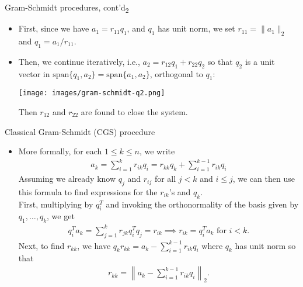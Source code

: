 \documentclass[t,usepdftitle=false]{beamer}
\begin{document}
\begin{frame}{Gram-Schmidt procedures, cont'd\textsubscript{2}}
\begin{itemize}
\item First, since we have $a_1=r_{11}q_1$, and $q_1$ has unit norm, we set $r_{11}=\|a_1\|_2$ and $q_1=a_1/r_{11}$.
\item Then, we continue iteratively, i.e., $a_2=r_{12}q_1+r_{22}q_2$ so that $q_2$ is a unit vector in $\mathrm{span}\{q_1,a_2\}=\mathrm{span}\{a_1,a_2\}$, orthogonal to $q_1$:\vspace{.2cm}
\begin{center}
\vspace{.2cm}
\texttt{[image: images/gram-schmidt-q2.png]}\vspace{.2cm}
\end{center}
Then $r_{12}$ and $r_{22}$ are found to close the system.
\end{itemize}
\end{frame}

\begin{frame}{Classical Gram-Schmidt (CGS) procedure}
\begin{itemize}
\item More formally, for each $1\leq k\leq n$, we write
\begin{align*}
a_k=\sum_{i=1}^kr_{ik}q_i=r_{kk}q_k+\sum_{i=1}^{k-1}r_{ik}q_i
\end{align*}
Assuming we already know $q_j$ and $r_{ij}$ for all $j<k$ and $i\leq j$, we can then use this formula to find expressions for the $r_{ik}$'s and $q_k$.\vspace{.1cm}\\
First, multiplying by $q_i^T$ and invoking the orthonormality of the basis given by $q_1,\dots,q_k$, we get
\begin{align*}
q_i^Ta_k=\sum_{j=1}^kr_{jk}q_i^Tq_j=r_{ik}
\implies
r_{ik}=q_i^Ta_k
\text{ for }
i< k.
\end{align*}
Next, to find $r_{kk}$, we have $q_kr_{kk}=a_k-\sum_{i=1}^{k-1}r_{ik}q_i$ where $q_k$ has unit norm so that
\begin{align*}
r_{kk}=\left\|a_k-\sum_{i=1}^{k-1}r_{ik}q_i\right\|_2.
\end{align*}
\end{itemize}
\end{frame}
\end{document}
